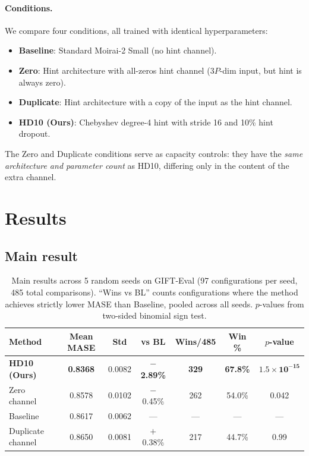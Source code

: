 \documentclass[11pt]{article}
\begin{document}
\paragraph{Conditions.} We compare four conditions, all trained with identical hyperparameters:
\begin{itemize}
    \item \textbf{Baseline}: Standard Moirai-2 Small (no hint channel).
    \item \textbf{Zero}: Hint architecture with all-zeros hint channel ($3P$-dim input, but hint is always zero).
    \item \textbf{Duplicate}: Hint architecture with a copy of the input as the hint channel.
    \item \textbf{HD10 (Ours)}: Chebyshev degree-4 hint with stride 16 and 10\% hint dropout.
\end{itemize}
The Zero and Duplicate conditions serve as capacity controls: they have the \emph{same architecture and parameter count} as HD10, differing only in the content of the extra channel.

\section{Results}

\subsection{Main result}

\begin{table}[t]
\centering
\caption{Main results across 5 random seeds on GIFT-Eval (97 configurations per seed, 485 total comparisons). ``Wins vs BL'' counts configurations where the method achieves strictly lower MASE than Baseline, pooled across all seeds. $p$-values from two-sided binomial sign test.}
\label{tab:main}
\small
\begin{tabular}{lcccccc}
\toprule
\textbf{Method} & \textbf{Mean MASE} & \textbf{Std} & \textbf{vs BL} & \textbf{Wins/485} & \textbf{Win \%} & \textbf{$p$-value} \\
\midrule
\textbf{HD10 (Ours)} & \textbf{0.8368} & 0.0082 & \textbf{$-$2.89\%} & \textbf{329} & \textbf{67.8\%} & $\mathbf{1.5 \times 10^{-15}}$ \\
Zero channel & 0.8578 & 0.0102 & $-$0.45\% & 262 & 54.0\% & 0.042 \\
Baseline & 0.8617 & 0.0062 & --- & --- & --- & --- \\
Duplicate channel & 0.8650 & 0.0081 & $+$0.38\% & 217 & 44.7\% & 0.99 \\
\bottomrule
\end{tabular}
\end{table}
\end{document}
